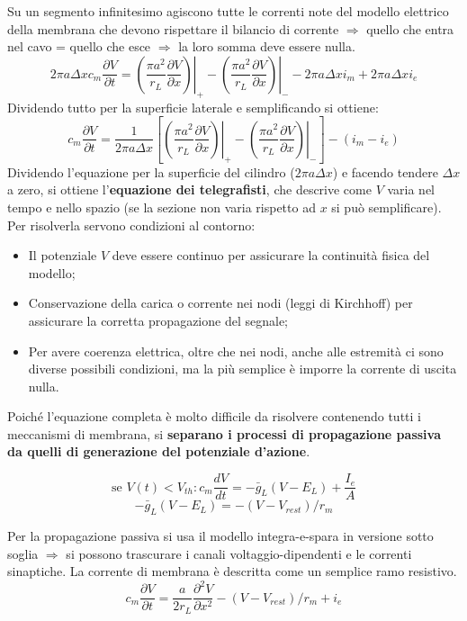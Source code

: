 Su un segmento infinitesimo agiscono tutte le correnti note del modello elettrico della membrana che devono rispettare il bilancio di corrente $\Rightarrow$ quello che entra nel cavo = quello che esce $\Rightarrow$ la loro somma deve essere nulla.
$$2\pi a \Delta x c_m \frac{\partial V}{\partial t} = \left. \left( \frac{\pi a^2}{r_L} \frac{\partial V}{\partial x} \right) \right|_+ - \left. \left( \frac{\pi a^2}{r_L} \frac{\partial V}{\partial x} \right) \right|_- - 2\pi a \Delta x i_m + 2\pi a \Delta x i_e$$
Dividendo tutto per la superficie laterale e semplificando si ottiene:
$$c_m \frac{\partial V}{\partial t} = \frac{1}{2\pi a \Delta x} \left[ \left. \left( \frac{\pi a^2}{r_L} \frac{\partial V}{\partial x} \right) \right|_+ - \left. \left( \frac{\pi a^2}{r_L} \frac{\partial V}{\partial x} \right) \right|_- \right] - (i_m - i_e)$$
Dividendo l’equazione per la superficie del cilindro ($2\pi a\Delta x$) e facendo tendere $\Delta x$ a zero, si ottiene l’\textbf{equazione dei telegrafisti}, che descrive come $V$ varia nel tempo e nello spazio (se la sezione non varia rispetto ad $x$ si può semplificare).
Per risolverla servono condizioni al contorno:
\begin{itemize}
  \item Il potenziale $V$ deve essere continuo per assicurare la continuità fisica del modello;
  \item Conservazione della carica o corrente nei nodi (leggi di Kirchhoff) per assicurare la corretta propagazione del segnale;
  \item Per avere coerenza elettrica, oltre che nei nodi, anche alle estremità ci sono diverse possibili condizioni, ma la più semplice è imporre la corrente di uscita nulla.
\end{itemize}


Poiché l’equazione completa è molto difficile da risolvere contenendo tutti i meccanismi di membrana, si \textbf{separano i processi di propagazione passiva da quelli di generazione del potenziale d’azione}. 

$$\text{se } V(t) < V_{th} : c_m \frac{dV}{dt} = -\bar{g}_L(V - E_L) + \frac{I_e}{A}$$
$$-\bar{g}_L(V - E_L) = -(V - V_{rest})/r_m$$

Per la propagazione passiva si usa il modello integra-e-spara in versione sotto soglia $\Rightarrow$ si possono trascurare i canali voltaggio-dipendenti e le correnti sinaptiche. La corrente di membrana è descritta come un semplice ramo resistivo.
$$c_m \frac{\partial V}{\partial t} = \frac{a}{2r_L} \frac{\partial^2 V}{\partial x^2} - (V - V_{rest})/r_m + i_e$$

